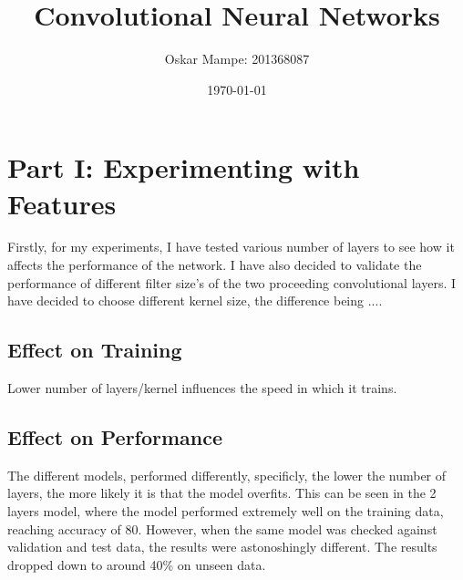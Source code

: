 \documentclass{report}
\author{Oskar Mampe: 201368087}
\date{\today}
\title{Convolutional Neural Networks}
\begin{document}
    \maketitle
    \tableofcontents

    \section{Part I: Experimenting with Features}


    Firstly, for my experiments, I have tested various number of layers to see how it affects the performance of the network. I have also decided to validate the performance of different filter size's of the two proceeding convolutional layers.  I have decided to choose different kernel size, the difference being ....

    \subsection{Effect on Training}
    Lower number of layers/kernel influences the speed in which it trains.


    \subsection{Effect on Performance}
    The different models, performed differently, specificly, the lower the number of layers, the more likely it is that the model overfits. This can be seen in the 2 layers model, where the model performed extremely well on the training data, reaching accuracy of 80. However, when the same model was checked against validation and test data, the results were astonoshingly different. The results dropped down to around 40\% on unseen data.
\end{document}
